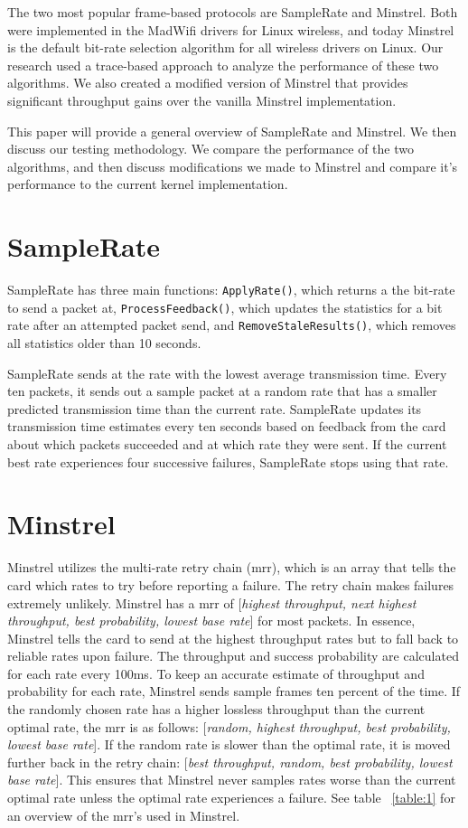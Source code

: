 \documentclass[letterpaper,twocolumn,10pt]{article}
\begin{document}
The two most popular frame-based protocols are SampleRate and Minstrel. Both were implemented in the MadWifi drivers for Linux wireless, and today Minstrel is the default bit-rate selection algorithm for all wireless drivers on Linux. Our research used a trace-based approach to analyze the performance of these two algorithms. We also created a modified version of Minstrel that provides significant throughput gains over the vanilla Minstrel implementation. 

This paper will provide a general overview of SampleRate and Minstrel. We then discuss our testing methodology. We compare the performance of the two algorithms, and then discuss modifications we made to Minstrel and compare it's performance to the current kernel implementation.
\section{SampleRate}

SampleRate has three main functions: \texttt{ApplyRate()}, which returns a the bit-rate to send a packet at, \texttt{ProcessFeedback()}, which updates the statistics for a bit rate after an attempted packet send,  and \texttt{RemoveStaleResults()}, which removes all statistics older than 10 seconds.

SampleRate sends at the rate with the lowest average transmission time. Every ten packets, it sends out a sample packet at a random rate that has a smaller predicted transmission time than the current rate. SampleRate updates its transmission time estimates every ten seconds based on feedback from the card about which packets succeeded and at which rate they were sent. If the current best rate experiences four successive failures, SampleRate stops using that rate. 

\section{Minstrel}

Minstrel utilizes the multi-rate retry chain (mrr), which is an array that tells the card which rates to try before reporting a failure. The retry chain makes failures extremely unlikely. Minstrel has a mrr of [\emph{highest throughput, next highest throughput, best probability, lowest base rate}] for most packets. In essence, Minstrel tells the card to send at the highest throughput rates but to fall back to reliable rates upon failure. The throughput and success probability are calculated for each rate every 100ms. 
To keep an accurate estimate of throughput and probability for each rate, Minstrel sends sample frames ten percent of the time. If the randomly chosen rate has a higher lossless throughput than the current optimal rate, the mrr is as follows: [\emph{random, highest throughput, best probability, lowest base rate}]. If the random rate is slower than the optimal rate, it is moved further back in the retry chain: [\emph{best throughput, random, best probability, lowest base rate}]. This ensures that Minstrel never samples rates worse than the current optimal rate unless the optimal rate experiences a failure. See table ~\ref{table:1} for an overview of the mrr's used in Minstrel.
\end{document}
